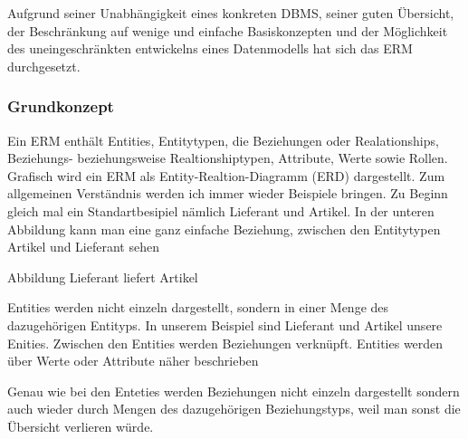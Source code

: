 \begin{flushleft}
Aufgrund seiner Unabhängigkeit eines konkreten DBMS, seiner guten Übersicht, der Beschränkung auf wenige und einfache Basiskonzepten und der Möglichkeit des uneingeschränkten entwickelns eines Datenmodells hat sich das ERM durchgesetzt.

\subsubsection{Grundkonzept}

Ein ERM enthält Entities, Entitytypen, die Beziehungen oder Realationships, Beziehungs- beziehungsweise Realtionshiptypen, Attribute, Werte sowie Rollen.
Grafisch wird ein ERM als Entity-Realtion-Diagramm (ERD) dargestellt. Zum allgemeinen Verständnis werden ich immer wieder Beispiele bringen. Zu Beginn gleich mal ein Standartbesipiel nämlich Lieferant und Artikel. In der unteren Abbildung kann man eine ganz einfache Beziehung, zwischen den Entitytypen Artikel und Lieferant sehen


Abbildung Lieferant liefert Artikel  



Entities werden nicht einzeln dargestellt, sondern in einer Menge des dazugehörigen Entityps. In unserem Beispiel sind Lieferant und Artikel unsere Enities. Zwischen den Entities werden Beziehungen verknüpft. Entities werden über Werte oder Attribute näher beschrieben

Genau wie bei den Enteties werden Beziehungen nicht einzeln dargestellt sondern auch wieder durch Mengen des dazugehörigen Beziehungstyps, weil man sonst die Übersicht verlieren würde.


\end{flushleft}
